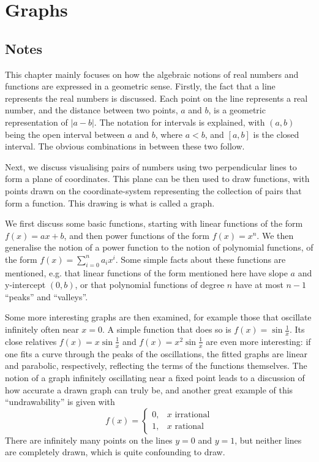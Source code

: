 \section{Graphs}

\subsection{Notes}
This chapter mainly focuses on how the algebraic notions of real numbers and functions are expressed in a geometric sense. Firstly, the fact that a line represents the real numbers is discussed. Each point on the line represents a real number, and the distance between two points, $a$ and $b$, is a geometric representation of $|a - b|$. The notation for intervals is explained, with $(a, b)$ being the open interval between $a$ and $b$, where $a < b$, and $[a, b]$ is the closed interval. The obvious combinations in between these two follow.

Next, we discuss visualising pairs of numbers using two perpendicular lines to form a plane of coordinates. This plane can be then used to draw functions, with points drawn on the coordinate-system representing the collection of pairs that form a function. This drawing is what is called a graph.

We first discuss some basic functions, starting with linear functions of the form $f(x) = ax + b$, and then power functions of the form $f(x) = x^n$. We then generalise the notion of a power function to the notion of polynomial functions, of the form $f(x) = \sum_{i = 0}^n a_i x^i$. Some simple facts about these functions are mentioned, e.g. that linear functions of the form mentioned here have slope $a$ and y-intercept $(0, b)$, or that polynomial functions of degree $n$ have at most $n - 1$ ``peaks'' and ``valleys''.

Some more interesting graphs are then examined, for example those that oscillate infinitely often near $x = 0$. A simple function that does so is $f(x) = \sin \frac{1}{x}$. Its close relatives $f(x) = x \sin \frac{1}{x}$ and $f(x) = x^2 \sin \frac{1}{x}$ are even more interesting: if one fits a curve through the peaks of the oscillations, the fitted graphs are linear and parabolic, respectively, reflecting the terms of the functions themselves. The notion of a graph infinitely oscillating near a fixed point leads to a discussion of how accurate a drawn graph can truly be, and another great example of this ``undrawability'' is given with
\[ f(x) = \begin{cases} 0, & x \textrm{ irrational} \\ 1, & x \textrm{ rational} \end{cases} \]
There are infinitely many points on the lines $y = 0$ and $y = 1$, but neither lines are completely drawn, which is quite confounding to draw.

